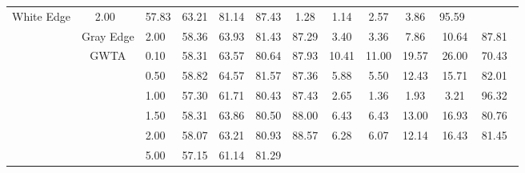\begin{table}[htbp]
{\begin{tabular}{cc|c|ccccccccc}
  White Edge &
  2.00\ &
  \multicolumn{1}{c|}{57.83} &
  \multicolumn{1}{c|}{63.21} &
  \multicolumn{1}{c|}{81.14} &
  \multicolumn{1}{c|}{87.43} &
  \multicolumn{1}{c|}{1.28} &
  \multicolumn{1}{c|}{1.14} &
  \multicolumn{1}{c|}{2.57} &
  \multicolumn{1}{c|}{3.86} &
  95.59\ \\ \cline{2-12} 
\multicolumn{1}{c|}{} &
  Gray Edge &
  2.00\ &
  \multicolumn{1}{c|}{58.36} &
  \multicolumn{1}{c|}{63.93} &
  \multicolumn{1}{c|}{81.43} &
  \multicolumn{1}{c|}{87.29} &
  \multicolumn{1}{c|}{3.40} &
  \multicolumn{1}{c|}{3.36} &
  \multicolumn{1}{c|}{7.86} &
  \multicolumn{1}{c|}{10.64} &
  87.81\ \\ \cline{2-12} 
\multicolumn{1}{c|}{} &
  \multirow{9}{*}{GWTA}&
  0.10\ &
  \multicolumn{1}{c|}{58.31} &
  \multicolumn{1}{c|}{63.57} &
  \multicolumn{1}{c|}{80.64} &
  \multicolumn{1}{c|}{87.93} &
  \multicolumn{1}{c|}{10.41} &
  \multicolumn{1}{c|}{11.00} &
  \multicolumn{1}{c|}{19.57} &
  \multicolumn{1}{c|}{26.00} &
  70.43\ \\ \cline{3-12} 
\multicolumn{1}{c|}{} &
   &
  0.50\ &
  \multicolumn{1}{c|}{58.82} &
  \multicolumn{1}{c|}{64.57} &
  \multicolumn{1}{c|}{81.57} &
  \multicolumn{1}{c|}{87.36} &
  \multicolumn{1}{c|}{5.88} &
  \multicolumn{1}{c|}{5.50} &
  \multicolumn{1}{c|}{12.43} &
  \multicolumn{1}{c|}{15.71} &
  82.01\ \\ \cline{3-12} 
\multicolumn{1}{c|}{} &
   &
  1.00\ &
  \multicolumn{1}{c|}{57.30} &
  \multicolumn{1}{c|}{61.71} &
  \multicolumn{1}{c|}{80.43} &
  \multicolumn{1}{c|}{87.43} &
  \multicolumn{1}{c|}{2.65} &
  \multicolumn{1}{c|}{1.36} &
  \multicolumn{1}{c|}{1.93} &
  \multicolumn{1}{c|}{3.21} &
  96.32\ \\ \cline{3-12} 
\multicolumn{1}{c|}{} &
   &
  1.50\ &
  \multicolumn{1}{c|}{58.31} &
  \multicolumn{1}{c|}{63.86} &
  \multicolumn{1}{c|}{80.50} &
  \multicolumn{1}{c|}{88.00} &
  \multicolumn{1}{c|}{6.43} &
  \multicolumn{1}{c|}{6.43} &
  \multicolumn{1}{c|}{13.00} &
  \multicolumn{1}{c|}{16.93} &
  80.76\ \\ \cline{3-12} 
\multicolumn{1}{c|}{} &
   &
  2.00\ &
  \multicolumn{1}{c|}{58.07} &
  \multicolumn{1}{c|}{63.21} &
  \multicolumn{1}{c|}{80.93} &
  \multicolumn{1}{c|}{88.57} &
  \multicolumn{1}{c|}{6.28} &
  \multicolumn{1}{c|}{6.07} &
  \multicolumn{1}{c|}{12.14} &
  \multicolumn{1}{c|}{16.43} &
  81.45\ \\ \cline{3-12} 
\multicolumn{1}{c|}{} &
   &
  5.00\ &
  \multicolumn{1}{c|}{57.15} &
  \multicolumn{1}{c|}{61.14} &
  \multicolumn{1}{c|}{81.29} &

\end{tabular}}
\end{table}
